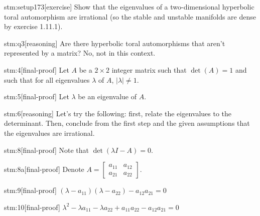 
\begin{stm}{stm:setup173}[exercise]
Show that the eigenvalues of a two-dimensional hyperbolic toral automorphism are irrational (so the stable and unstable manifolds are dense by exercise 1.11.1).
\end{stm}


\begin{stm}{stm:q3}[reasoning]
Are there hyperbolic toral automorphisms that aren't represented by a matrix? No, not in this context.
\end{stm}

\begin{stm}{stm:4}[final-proof]
Let $A$ be a $2 \times 2$ integer matrix such that $\det(A) = 1$ and such that for all eigenvalues $\lambda$ of $A$, $|\lambda| \neq 1$.
\end{stm}

\begin{stm}{stm:5}[final-proof]
Let $\lambda$ be an eigenvalue of $A$.
\end{stm}

\begin{stm}{stm:6}[reasoning]
Let's try the following: first, relate the eigenvalues to the determinant. Then, conclude from the first step and the given assumptions that the eigenvalues are irrational.
\end{stm}

\begin{stm}{stm:8}[final-proof]
Note that $\det(\lambda I - A) = 0$.
\end{stm}

\begin{stm}{stm:8a}[final-proof]
Denote $A = \begin{bmatrix} a_{11} & a_{12} \\ a_{21} & a_{22} \end{bmatrix}$.
\end{stm}

\begin{stm}{stm:9}[final-proof]
$(\lambda - a_{11})(\lambda - a_{22}) - a_{12}a_{21} = 0$
\end{stm}

\begin{stm}{stm:10}[final-proof]
$\lambda^2 - \lambda a_{11} - \lambda a_{22} + a_{11}a_{22} - a_{12}a_{21} = 0$
\end{stm}

